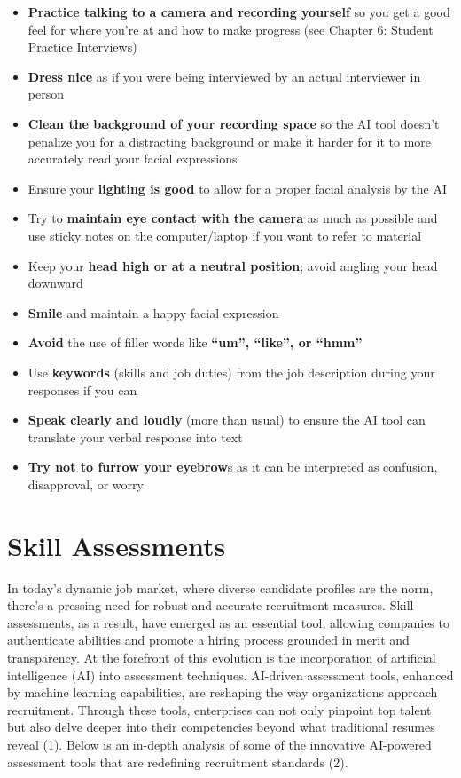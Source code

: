 \documentclass[
]{book}
\begin{document}
\begin{itemize}
\item
  \textbf{Practice talking to a camera and recording yourself} so you get a good feel for where you're at and how to make progress (see Chapter 6: Student Practice Interviews)
\item
  \textbf{Dress nice} as if you were being interviewed by an actual interviewer in person
\item
  \textbf{Clean the background of your recording space} so the AI tool doesn't penalize you for a distracting background or make it harder for it to more accurately read your facial expressions
\item
  Ensure your \textbf{lighting is good} to allow for a proper facial analysis by the AI
\item
  Try to \textbf{maintain eye contact with the camera} as much as possible and use sticky notes on the computer/laptop if you want to refer to material
\item
  Keep your \textbf{head high or at a neutral position}; avoid angling your head downward
\item
  \textbf{Smile} and maintain a happy facial expression
\item
  \textbf{Avoid} the use of filler words like \textbf{``um'', ``like'', or ``hmm''}
\item
  Use \textbf{keywords} (skills and job duties) from the job description during your responses if you can
\item
  \textbf{Speak clearly and loudly} (more than usual) to ensure the AI tool can translate your verbal response into text
\item
  \textbf{Try not to furrow your eyebrow}s as it can be interpreted as confusion, disapproval, or worry
\end{itemize}

\hypertarget{skill-assessments}{%
\chapter{Skill Assessments}\label{skill-assessments}}

In today's dynamic job market, where diverse candidate profiles are the norm, there's a pressing need for robust and accurate recruitment measures. Skill assessments, as a result, have emerged as an essential tool, allowing companies to authenticate abilities and promote a hiring process grounded in merit and transparency. At the forefront of this evolution is the incorporation of artificial intelligence (AI) into assessment techniques. AI-driven assessment tools, enhanced by machine learning capabilities, are reshaping the way organizations approach recruitment. Through these tools, enterprises can not only pinpoint top talent but also delve deeper into their competencies beyond what traditional resumes reveal (1). Below is an in-depth analysis of some of the innovative AI-powered assessment tools that are redefining recruitment standards (2).
\end{document}
